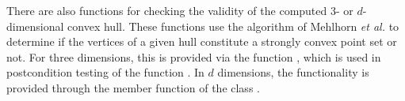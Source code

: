 There are also functions for checking the validity of the computed 3-
or $d$-dimensional convex hull.  These functions use the algorithm of
Mehlhorn \textit{et al.} \cite{mnssssu-cgpvg-96} to determine if the
vertices of a given hull constitute a strongly convex point set or not.
For three dimensions, this is provided via the function 
, which
is used in postcondition testing of the function
.  
In $d$ dimensions, the functionality is provided through the 
member function of the class .
